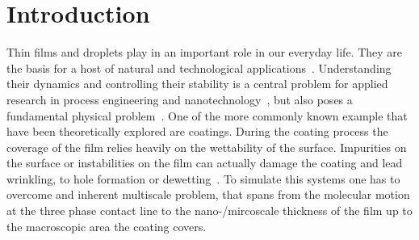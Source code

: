 \documentclass[twoside,twocolumn,9pt]{article}
\begin{document}
\section{Introduction}
\label{sec:intro}
Thin films and droplets play in an important role in our everyday life.
They are the basis for a host of natural and technological applications~\cite{degennesCapillarityWettingPhenomena2004, ronsinPhaseFieldSimulationsMorphology2022, fockeLabonaFoilMicrofluidicsThin2010}.
Understanding their dynamics and controlling their stability is a central problem for applied research in process engineering and nanotechnology~\cite{singhInkjetPrintingProcess2010, quereFluidCoatingFiber1999, utadaDrippingJettingDrops2007}, but also poses a fundamental physical problem~\cite{oronLongscaleEvolutionThin1997, beckerComplexDewettingScenarios2003, thielePatternedDepositionMoving2014, wilczekSlidingDropsEnsemble2017, peschkaSignaturesSlipDewetting2019}.
One of the more commonly known example that have been theoretically explored are coatings. 
During the coating process the coverage of the film relies heavily on the wettability of the surface. 
Impurities on the surface or instabilities on the film can actually damage the coating and lead wrinkling, to hole formation or dewetting~\cite{bonnWettingSpreading2009, chenWrinklingInstabilitiesPolymer2012}. 
To simulate this systems one has to overcome and inherent multiscale problem, that spans from the molecular motion at the three phase contact line to the nano-/mircoscale thickness of the film up to the macroscopic area the coating covers. 
\end{document}

